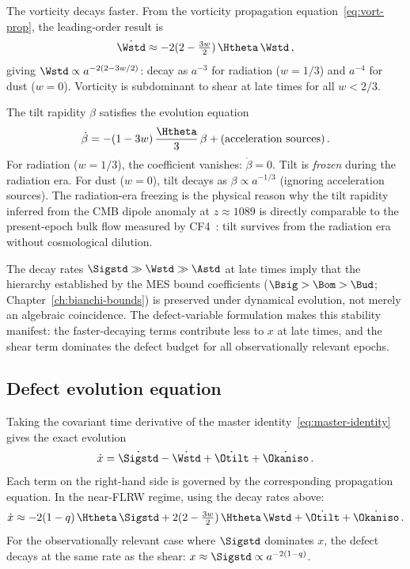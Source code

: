 The vorticity decays faster.  From the vorticity propagation
equation~\eqref{eq:vort-prop}, the leading-order result is
\begin{equation}\label{eq:Wstd-dot}
\dot{\Wstd} \approx -2(2 - \tfrac{3w}{2})\,\Htheta\,\Wstd\,,
\end{equation}
giving $\Wstd \propto a^{-2(2-3w/2)}$: decay as $a^{-3}$ for
radiation ($w = 1/3$) and $a^{-4}$ for dust ($w = 0$).  Vorticity
is subdominant to shear at late times for all $w < 2/3$.

The tilt rapidity $\beta$ satisfies the evolution equation
\begin{equation}\label{eq:beta-dot}
\dot{\beta}
= -(1 - 3w)\,\frac{\Htheta}{3}\,\beta
  + (\text{acceleration sources})\,.
\end{equation}
For radiation ($w = 1/3$), the coefficient vanishes:
$\dot{\beta} = 0$.  Tilt is \emph{frozen} during the
radiation era.  For dust ($w = 0$), tilt decays as $\beta
\propto a^{-1/3}$ (ignoring acceleration sources).  The
radiation-era freezing is the physical reason why the tilt
rapidity inferred from the CMB dipole anomaly at $z \approx
1089$ is directly comparable to the present-epoch bulk flow
measured by CF4~\cite{Watkins2023}: tilt survives from the
radiation era without cosmological dilution.

\begin{remark}
\label{rem:hierarchy-conservation}
The decay rates $\Sigstd \gg \Wstd \gg \Astd$ at late times
imply that the hierarchy established by the MES bound
coefficients ($\Bsig > \Bom > \Bud$;
Chapter~\ref{ch:bianchi-bounds}) is preserved under dynamical
evolution, not merely an algebraic coincidence.  The
defect-variable formulation makes this stability manifest:
the faster-decaying terms contribute less to $x$ at late times,
and the shear term dominates the defect budget for all
observationally relevant epochs.
\end{remark}


\subsection{Defect evolution equation}\label{sec:defect-evol}

Taking the covariant time derivative of the master
identity~\eqref{eq:master-identity} gives the exact evolution
\begin{equation}\label{eq:xdot}
\dot{x} = \dot{\Sigstd} - \dot{\Wstd}
  + \dot{\Otilt} + \dot{\Okaniso}\,.
\end{equation}
Each term on the right-hand side is governed by the
corresponding propagation equation.  In the near-FLRW regime,
using the decay rates above:
\begin{equation}\label{eq:xdot-approx}
\dot{x} \approx -2(1 - q)\,\Htheta\,\Sigstd
  + 2(2 - \tfrac{3w}{2})\,\Htheta\,\Wstd
  + \dot{\Otilt} + \dot{\Okaniso}\,.
\end{equation}
For the observationally relevant case where $\Sigstd$
dominates $x$, the defect decays at the same rate as the
shear: $x \approx \Sigstd \propto a^{-2(1-q)}$.

